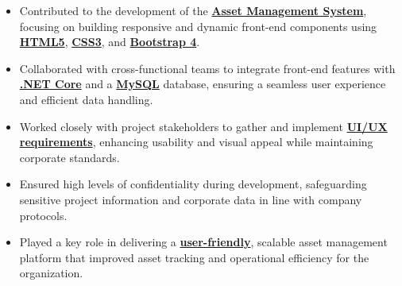 \documentclass[]{deedy-resume-openfont}
\begin{document}
\begin{minipage}[t]{1.0\textwidth}
\begin{itemize}
    \item Contributed to the development of the \textbf{\underline{Asset Management System}}, focusing on building responsive and dynamic front-end components using \textbf{\underline{HTML5}}, \textbf{\underline{CSS3}}, and \textbf{\underline{Bootstrap 4}}.
    \item Collaborated with cross-functional teams to integrate front-end features with \textbf{\underline{.NET Core}} and a \textbf{\underline{MySQL}} database, ensuring a seamless user experience and efficient data handling.
    \item Worked closely with project stakeholders to gather and implement \textbf{\underline{UI/UX requirements}}, enhancing usability and visual appeal while maintaining corporate standards.
    \item Ensured high levels of confidentiality during development, safeguarding sensitive project information and corporate data in line with company protocols.
    \item Played a key role in delivering a \textbf{\underline{user-friendly}}, scalable asset management platform that improved asset tracking and operational efficiency for the organization.
\end{itemize}
\sectionsep




\end{minipage}
\end{document}
